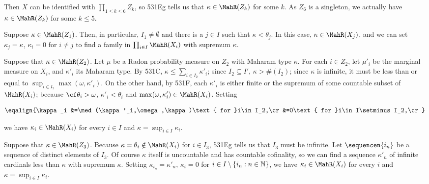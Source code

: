 {




\noindent Then $X$ can be identified with $\prod_{1\le k\le 6}Z_k$, so
531Eg tells us that $\kappa\in\MahR(Z_k)$ for some $k$.   As $Z_6$ is a
singleton, we actually have $\kappa\in\MahR(Z_k)$ for some $k\le 5$.

\medskip

 Suppose $\kappa\in\MahR(Z_1)$.   Then, in particular,
$I_1\ne\emptyset$ and there is a $j\in I$ such that $\kappa<\theta_j$.
In this case, $\kappa\in\MahR(X_j)$, and we can set $\kappa_j=\kappa$,
$\kappa_i=0$ for $i\ne j$ to find a family in $\prod_{i\in I}\MahR(X_i)$
with supremum $\kappa$.

\medskip

 Suppose that $\kappa\in\MahR(Z_2)$.   Let $\mu$ be a
Radon probability measure on $Z_2$ with Maharam type $\kappa$.   For
each $i\in Z_2$, let $\mu'_i$ be the marginal measure on $X_i$, and
$\kappa'_i$ its Maharam type.   By 531C,
$\kappa\le\sum_{i\in I_2}\kappa'_i$;  since $I_2\subseteq I'$,
$\kappa>\#(I_2)$;  since $\kappa$ is infinite, it must be less than or
equal to $\sup_{i\in I_2}\max(\omega,\kappa'_i)$.   On the other hand,
by 531F, each $\kappa'_i$ is either finite or the supremum of some
countable subset of $\MahR(X_i)$;  because $\cf\theta_i>\omega$,
$\kappa'_i<\theta_i$ and $\max(\omega,\kappa'_i)\in\MahR(X_i)$.
Setting

$$\eqalign{\kappa_i
&=\med(\kappa'_i,\omega,\kappa)\text{ for }i\in I_2,\cr
&=0\text{ for }i\in I\setminus I_2,\cr}$$

\noindent we have $\kappa_i\in\MahR(X_i)$ for every $i\in I$ and
$\kappa=\sup_{i\in I}\kappa_i$.

\medskip

 Suppose that $\kappa\in\MahR(Z_3)$.   Because
$\kappa=\theta_i\notin\MahR(X_i)$ for $i\in I_3$, 531Eg tells us that
$I_3$ must be infinite.   Let $\sequencen{i_n}$ be a sequence of
distinct elements of $I_3$.   Of course $\kappa$ itself is uncountable
and has countable cofinality, so we can find a sequence $\kappa'_n$ of
infinite cardinals less than $\kappa$ with supremum $\kappa$.   Setting
$\kappa_{i_n}=\kappa'_n$, $\kappa_i=0$ for
$i\in I\setminus\{i_n:n\in\Bbb N\}$, we have $\kappa_i\in\MahR(X_i)$ for
every $i$ and $\kappa=\sup_{i\in I}\kappa_i$.

}
